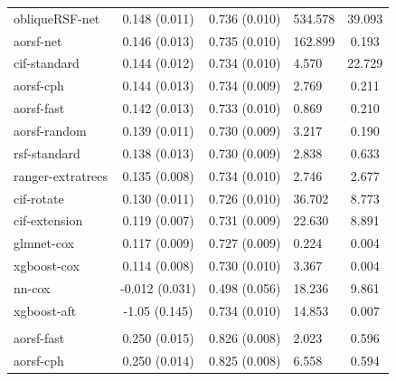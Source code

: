 \documentclass[twoside,11pt]{article}\usepackage[]{graphicx}\usepackage[]{xcolor}
\newenvironment{knitrout}{}{} %
\begin{document}
\begin{knitrout}
\begin{longtable}[t]{lcclc}
\hline
\hspace{1em}obliqueRSF-net & 0.148 (0.011) & 0.736 (0.010) & 534.578 & 39.093\\
\hspace{1em}aorsf-net & 0.146 (0.013) & 0.735 (0.010) & 162.899 & 0.193\\
\hspace{1em}cif-standard & 0.144 (0.012) & 0.734 (0.010) & 4.570 & 22.729\\
\hspace{1em}aorsf-cph & 0.144 (0.013) & 0.734 (0.009) & 2.769 & 0.211\\
\hspace{1em}aorsf-fast & 0.142 (0.013) & 0.733 (0.010) & 0.869 & 0.210\\
\hspace{1em}aorsf-random & 0.139 (0.011) & 0.730 (0.009) & 3.217 & 0.190\\
\hspace{1em}rsf-standard & 0.138 (0.013) & 0.730 (0.009) & 2.838 & 0.633\\
\hspace{1em}ranger-extratrees & 0.135 (0.008) & 0.734 (0.010) & 2.746 & 2.677\\
\hspace{1em}cif-rotate & 0.130 (0.011) & 0.726 (0.010) & 36.702 & 8.773\\
\hspace{1em}cif-extension & 0.119 (0.007) & 0.731 (0.009) & 22.630 & 8.891\\
\hspace{1em}glmnet-cox & 0.117 (0.009) & 0.727 (0.009) & 0.224 & 0.004\\
\hspace{1em}xgboost-cox & 0.114 (0.008) & 0.730 (0.010) & 3.367 & 0.004\\
\hspace{1em}nn-cox & -0.012 (0.031) & 0.498 (0.056) & 18.236 & 9.861\\
\hspace{1em}xgboost-aft & -1.05 (0.145) & 0.734 (0.010) & 14.853 & 0.007\\
\addlinespace[0.3em]
\hline
\multicolumn{5}{l}{\textit{\textbf{Serum free light chain; death, n = 7874, p = 10}}}\\
\hline
\hspace{1em}aorsf-fast & 0.250 (0.015) & 0.826 (0.008) & 2.023 & 0.596\\
\hspace{1em}aorsf-cph & 0.250 (0.014) & 0.825 (0.008) & 6.558 & 0.594\\

\end{longtable}
\end{knitrout}
\end{document}
